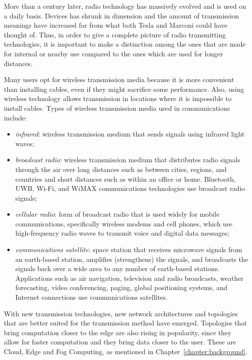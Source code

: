 		More than a century later, radio technology has massively evolved and is used on a daily basis.
		Devices has shrunk in dimension and the amount of transmission meanings have increased far from what both Tesla and Marconi could have thought of.
		Thus, in order to give a complete picture of radio transmitting technologies, it is important to make a distinction among the ones that are made for internal or nearby use compared to the ones which are used for longer distances.
		
		Many users opt for wireless transmission media because it is more convenient than installing cables, even if they might sacrifice some performance. 
		Also, using wireless technology allows transmission in locations where it is impossible to install cables.
		Types of wireless transmission media used in communications include:
		\begin{itemize}
			\item \textit{infrared}: wireless transmission medium that sends signals using infrared light waves;
			\item \textit{broadcast radio}: wireless transmission medium that distributes radio signals through the air over long distances such as between cities, regions, and countries and short distances such as within an office or home.
			Bluetooth, UWB, Wi-Fi, and WiMAX communications technologies use broadcast radio signals;
			\item \textit{cellular radio}: form of broadcast radio that is used widely for mobile communications, specifically wireless modems and cell phones, which use high-frequency radio waves to transmit voice and digital data messages;
			\item \textit{communications satellite}: space station that receives microwave signals from an earth-based station, amplifies (strengthens) the signals, and broadcasts the signals back over a wide area to any number of earth-based stations.
			Applications such as air navigation, television and radio broadcasts, weather forecasting, video conferencing, paging, global positioning systems, and Internet connections use communications satellites.
		\end{itemize}
		
		With new transmission technologies, new network architectures and topologies that are better suited for the transmission method have emerged.
		Topologies that bring computation closer to the edge are also rising in popularity, since they allow for faster computation and they bring data closer to the user.
		These are Cloud, Edge and Fog Computing, as mentioned in Chapter~\ref{chapter:background}.
		
